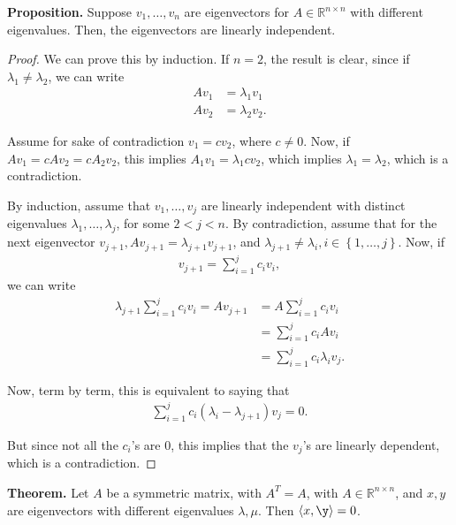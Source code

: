 \documentclass{article}
\newcommand{\RR}{\mathbb{R}}
\newcommand{\la}{\langle}
\newcommand{\ra}{\rangle}
\begin{document}
{\bf Proposition.} Suppose $v_1, \dots, v_n$ are eigenvectors for $A \in \RR^{n \times n}$ with different eigenvalues.  Then, the eigenvectors are linearly independent.

\begin{proof}
  We can prove this by induction.   If $n = 2$, the result is clear, since if $\lambda_1 \neq \lambda_2$, we can write
  \begin{align*}
    Av_1 &= \lambda_1 v_1 \\ 
    A v_2 &= \lambda_2 v_2.
  \end{align*}

  Assume for sake of contradiction $v_1 = c v_2$, where $c \neq 0$.  Now, if $A v_1 = c A v_2 = c A_2 v_2$, this implies $A_1 v_1 = \lambda_1 c v_2$, which implies $\lambda_1 = \lambda_2$, which is a contradiction.

  By induction, assume that $v_1, \dots, v_j$ are linearly independent with distinct eigenvalues $\lambda_1, \dots, \lambda_j$, for some $2 < j < n$. By contradiction, assume that for the next eigenvector $v_{j+1}, A v_{j+1} = \lambda_{j+1} v_{j+1}$, and $\lambda_{j+1} \neq \lambda_i, i \in \left\{ 1, \dots, j \right\}$.  Now, if
  \begin{align*}
    v_{j+1}  = \sum_{i=1}^{j} c_i v_i,
  \end{align*}
  we can write
  \begin{align*}
    \lambda_{j+1} \sum_{i=1}^{j} c_i v_i  = A v_{j+1} &= A \sum_{i=1}^{j} c_i v_i \\
    &= \sum_{i=1}^{j} c_i A v_i \\ 
    &= \sum_{i=1}^{j} c_i \lambda_i v_j.
  \end{align*}

  Now, term by term, this is equivalent to saying that
  \begin{align*}
    \sum_{i=1}^{j} c_i (\lambda_i - \lambda_{j+1}) v_j = 0.
  \end{align*}

  But since not all the $c_i$'s are 0, this implies that the $v_j$'s are linearly dependent, which is a contradiction.
 \end{proof}

 {\bf Theorem.} Let $A$ be a symmetric matrix, with $A^T = A$, with $A \in \RR^{n \times n}$, and $x, y$ are eigenvectors with different eigenvalues $\lambda, \mu$.  Then $\la x, \y \ra = 0$.
\end{document}
